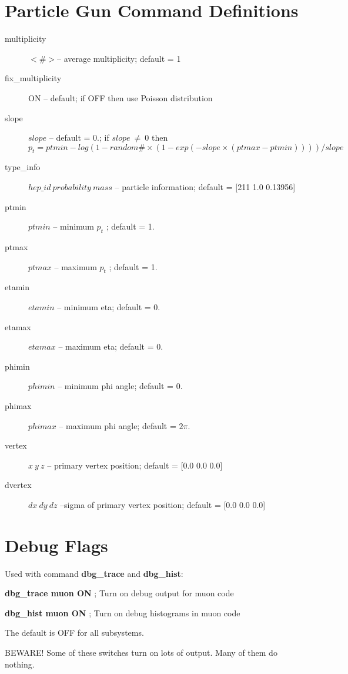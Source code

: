 \section{Particle Gun Command Definitions}
\begin{description}
\item[multiplicity] $<\#>$--  average multiplicity; default = 1
\item[fix\_multiplicity] ON -- default; if OFF then use Poisson distribution 
\item[slope] $slope$ --  default = 0.;    
if $slope\ \neq\ 0$ then $   p_t = ptmin - log(1 - random \# \times (1-exp(-slope \times (ptmax-ptmin)) )) / slope $
\item[type\_info] $hep\_id\ probability\ mass$ -- particle information; default = [211 1.0 0.13956]
\item[ptmin]  $ptmin$ --   minimum $p_t$ ; default = 1.
\item[ptmax]  $ptmax$ --   maximum $p_t$ ; default = 1.
\item[etamin] $etamin$ --  minimum eta; default = 0.
\item[etamax] $etamax$ --  maximum eta; default = 0.
\item[phimin] $phimin$ --  minimum phi angle; default = 0.
\item[phimax] $phimax$ --  maximum phi angle; default = $2 \pi$.
\item[vertex] $x\ y\ z$ -- primary vertex position; default = [0.0 0.0 0.0]
\item[dvertex] $dx\ dy\ dz$ --sigma of primary vertex position; default = [0.0 0.0 0.0]
\end{description}

\filbreak

\section{Debug Flags}

Used with command {\bf dbg\_trace} and {\bf dbg\_hist}:  

\centerline {{\bf dbg\_trace muon ON} ;  Turn on debug output for muon code}
\centerline {{\bf dbg\_hist muon ON}  ;  Turn on debug histograms in muon code}

The default is OFF for all subsystems.

BEWARE! Some of these switches turn on lots of output.  Many of them do nothing.

